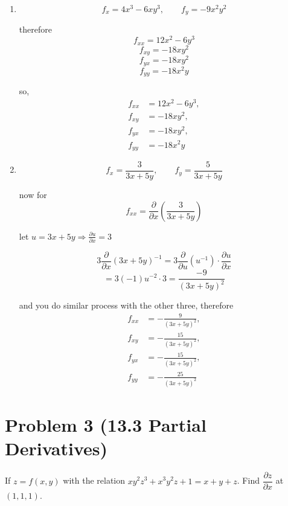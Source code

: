 \documentclass{article}
\theoremstyle{remark}
\begin{document}
\begin{enumerate}[label=(\alph*)]
    \item
    \[
        f_x = 4x^3 - 6xy^3, \qquad f_y = -9x^2y^2
    \]

    therefore
    \[
        f_{xx} = 12x^2 - 6y^3
    \]
    \[
        f_{xy} = -18xy^2
    \]
    \[
        f_{yx} = -18xy^2
    \]
    \[
        f_{yy} = -18x^2y
    \]

    so,
    \[
        \boxed{
        \begin{aligned}
            f_{xx} &= 12x^2 - 6y^3, \\
            f_{xy} &= -18xy^2, \\
            f_{yx} &= -18xy^2, \\
            f_{yy} &= -18x^2y
        \end{aligned}}
    \]

    \item
    \[
        f_x = \frac{3}{3x+5y}, \qquad f_y = \frac{5}{3x+5y}
    \]

    now for
    \[
        f_{xx} = \frac{\partial}{\partial x}\left(\frac{3}{3x+5y}\right)
    \]

    let $u = 3x+5y \Rightarrow \frac{\partial u}{\partial x} = 3$

    \[
        3 \frac{\partial}{\partial x}(3x+5y)^{-1}
        = 3 \frac{\partial}{\partial u}(u^{-1}) \cdot \frac{\partial u}{\partial x}
    \]
    \[
        = 3(-1)u^{-2}\cdot 3 = \frac{-9}{(3x+5y)^2}
    \]

    and you do similar process with the other three, therefore
    \[
        \boxed{
        \begin{aligned}
            f_{xx} &= -\frac{9}{(3x+5y)^2}, \\
            f_{xy} &= -\frac{15}{(3x+5y)^2}, \\
            f_{yx} &= -\frac{15}{(3x+5y)^2}, \\
            f_{yy} &= -\frac{25}{(3x+5y)^2}
        \end{aligned}}
    \]
\end{enumerate}

\vspace{1em}
\hrulefill

\section*{Problem 3 (13.3 Partial Derivatives)}
If $z = f(x, y)$ with the relation $xy^2z^3 + x^3y^2z + 1 = x + y + z$. Find $\dfrac{\partial z}{\partial x}$ at $(1, 1, 1)$.
\end{document}
